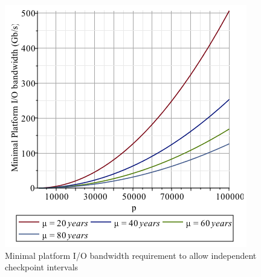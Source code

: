 \documentclass{article}
\begin{document}
\begin{figure}[h!]
\begin{center}
  \includegraphics[width=.6\linewidth]{biomin.png}
\end{center}
\caption{Minimal platform I/O bandwidth requirement to allow independent checkpoint intervals\label{fig:minio}}
\end{figure}
\end{document}
